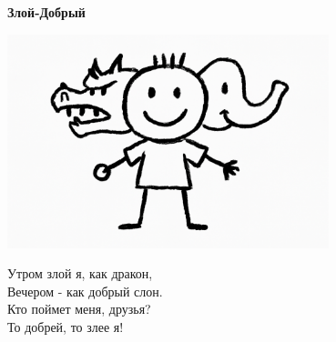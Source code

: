 \vspace*{\fill}
\begin{center}
  {\huge\textbf{Злой-Добрый}}

  \vspace{1.5em}
  \includegraphics[width=0.7\textwidth]{pictures/zloi-dobry.png}
  \vspace{4em}
  \parbox{0.6\textwidth}{
    \LARGE
    \begin{spacing}{1.2}
      Утром злой я, как дракон,\\
      Вечером - как добрый слон.\\
      Кто поймет меня, друзья?\\
      То добрей, то злее я! %
    \end{spacing}
      
  }
\end{center}
\vspace*{\fill}